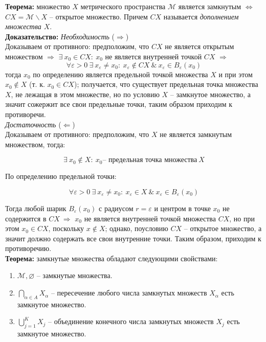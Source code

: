 \documentclass[a4paper,12pt]{article} %
\begin{document}
\noindent \textbf{Теорема:} множество $X$ метрического пространства $\mathscr{M}$ является замкнутым $\Leftrightarrow$ $CX = \mathscr{M} \backslash X$ -- открытое множество. Причем $CX$ называется \textit{дополнением множества $X$}.\\

\noindent \textbf{Доказательство:} \textit{Необходимость} ($\Rightarrow$)\\

\noindent Доказываем от противного: предположим, что $CX$ не является открытым множеством $\Rightarrow$ $\exists ~ x_0 \in CX : ~ x_0$ не является внутренней точкой $CX$ $\Rightarrow$ 
\[\forall \varepsilon > 0 ~ \exists ~ x_{\varepsilon} \neq x_0 : ~ x_{\varepsilon} \notin CX ~ \& ~ x_{\varepsilon} \in B_{\varepsilon}(x_0)\]
тогда $x_0$ по определению является предельной точкой множества $X$ и при этом $x_0 \notin X$ (т. к. $x_0 \in CX$); получается, что существует предельная точка множества $X$, не лежащая в этом множестве, но по условию $X$ -- замкнутое множество, а значит сожержит все свои предельные точки, таким образом приходим к противоречи.\\

\noindent \textit{Достаточность} ($\Leftarrow$)\\

\noindent Доказываем от противного: предположим, что $X$ не является замкнутым множеством, тогда:

\[ \exists ~ x_0 \notin X : ~ x_0 \text{-- предельная точка множества} ~ X \]

\noindent По определению предельной точки:

\[ \forall \varepsilon > 0 ~ \exists ~ x_{\varepsilon} \neq x_0 : ~ x_{\varepsilon} \in X ~ \& ~ x_{\varepsilon} \in B_{\varepsilon}(x_0) \]

\noindent Тогда любой шарик $B_{\varepsilon}(x_0)$ с радиусом $r = \varepsilon$ и центром в точке $x_0$ не содержится в $CX ~ \Rightarrow$ $x_0$ не является внутренней точкой множества $CX$, но при этом $x_0 \in CX$, поскольку $x \notin X$; однако, поусловию $CX$ -- открытое множество, а значит должно содержать все свои внутренние точки. Таким образом, приходим к противоречию.\\

\noindent \textbf{Теорема:} замкнутые множества обладают следующими свойствами:

\begin{enumerate}
    \item $\mathscr{M}, \varnothing$ -- замкнутые множества.
    \item $\bigcap \limits_{\alpha \in A} X_{\alpha}$ -- пересечение любого числа замкнутых множеств $X_{\alpha}$ есть замкнутое множество.
    \item $\bigcup \limits_{j = 1}^K X_j$ -- объединение конечного числа замкнутых множеств $X_j$ есть замкнутое множество.
\end{enumerate}
\end{document}
